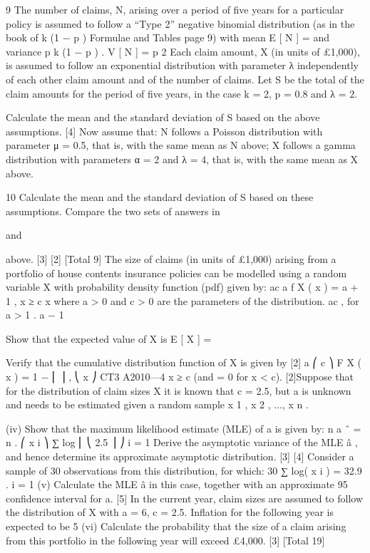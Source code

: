 9
The number of claims, N, arising over a period of five years for a particular policy is
assumed to follow a “Type 2” negative binomial distribution (as in the book of
k (1 − p )
Formulae and Tables page 9) with mean E [ N ] =
and variance
p
k (1 − p )
.
V [ N ] =
p 2
Each claim amount, X (in units of £1,000), is assumed to follow an exponential
distribution with parameter λ independently of each other claim amount and of the
number of claims.
Let S be the total of the claim amounts for the period of five years, in the case
k = 2, p = 0.8 and λ = 2.
\item 
Calculate the mean and the standard deviation of S based on the above
assumptions.
[4]
Now assume that:
N follows a Poisson distribution with parameter μ = 0.5, that is, with the same
mean as N above;
X follows a gamma distribution with parameters α = 2 and λ = 4, that is, with
the same mean as X above.
\item 
\item 
10
Calculate the mean and the standard deviation of S based on these
assumptions.
Compare the two sets of answers in \item  and \item  above.
[3]
[2]
[Total 9]
The size of claims (in units of £1,000) arising from a portfolio of house contents
insurance policies can be modelled using a random variable X with probability density
function (pdf) given by:
ac a
f X ( x ) = a + 1 , x ≥ c
x
where a > 0 and c > 0 are the parameters of the distribution.
ac
, for a > 1 .
a − 1
\item  Show that the expected value of X is E [ X ] =
\item  Verify that the cumulative distribution function of X is given by
[2]
a
⎛ c ⎞
F X ( x ) = 1 − ⎜ ⎟ ,
⎝ x ⎠
CT3 A2010—4
x ≥ c
(and = 0 for x < c).
[2]Suppose that for the distribution of claim sizes X it is known that c = 2.5, but a is
unknown and needs to be estimated given a random sample x 1 , x 2 , ..., x n .
\item 
(iv)
Show that the maximum likelihood estimate (MLE) of a is given by:
n
a ˆ = n
.
⎛ x i ⎞
∑ log ⎜ ⎝ 2.5 ⎟ ⎠
i = 1
Derive the asymptotic variance of the MLE â , and hence determine its
approximate asymptotic distribution.
[3]
[4]
Consider a sample of 30 observations from this distribution, for which:
30
∑ log( x i ) = 32.9 .
i = 1
(v)
Calculate the MLE â in this case, together with an approximate 95%
confidence interval for a.
[5]
In the current year, claim sizes are assumed to follow the distribution of X with a = 6,
c = 2.5. Inflation for the following year is expected to be 5%
(vi)
Calculate the probability that the size of a claim arising from this portfolio in
the following year will exceed £4,000.
[3]
[Total 19]


